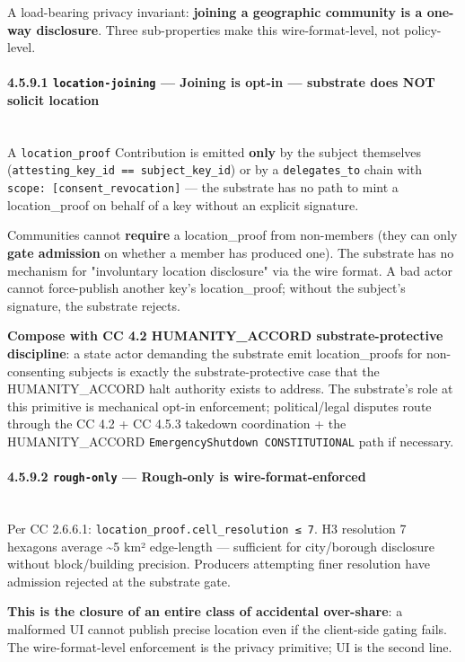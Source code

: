 \documentclass[11pt]{article}
\begin{document}
A load-bearing privacy invariant: \textbf{joining a geographic community is a one-way disclosure}. Three sub-properties make this wire-format-level, not policy-level.


\paragraph{4.5.9.1 \texttt{location-joining} — Joining is opt-in — substrate does NOT solicit location}\mbox{}\\


A \texttt{location\_proof} Contribution is emitted \textbf{only} by the subject themselves (\texttt{attesting\_key\_id == subject\_key\_id}) or by a \texttt{delegates\_to} chain with \texttt{scope: [consent\_revocation]} — the substrate has no path to mint a location\_proof on behalf of a key without an explicit signature.


Communities cannot \textbf{require} a location\_proof from non-members (they can only \textbf{gate admission} on whether a member has produced one). The substrate has no mechanism for "involuntary location disclosure" via the wire format. A bad actor cannot force-publish another key's location\_proof; without the subject's signature, the substrate rejects.


\textbf{Compose with CC 4.2 HUMANITY\_ACCORD substrate-protective discipline}: a state actor demanding the substrate emit location\_proofs for non-consenting subjects is exactly the substrate-protective case that the HUMANITY\_ACCORD halt authority exists to address. The substrate's role at this primitive is mechanical opt-in enforcement; political/legal disputes route through the CC 4.2 + CC 4.5.3 takedown coordination + the HUMANITY\_ACCORD \texttt{EmergencyShutdown CONSTITUTIONAL} path if necessary.


\paragraph{4.5.9.2 \texttt{rough-only} — Rough-only is wire-format-enforced}\mbox{}\\


Per CC 2.6.6.1: \texttt{location\_proof.cell\_resolution ≤ 7}. H3 resolution 7 hexagons average \textasciitilde{}5 km² edge-length — sufficient for city/borough disclosure without block/building precision. Producers attempting finer resolution have admission rejected at the substrate gate.


\textbf{This is the closure of an entire class of accidental over-share}: a malformed UI cannot publish precise location even if the client-side gating fails. The wire-format-level enforcement is the privacy primitive; UI is the second line.
\end{document}
